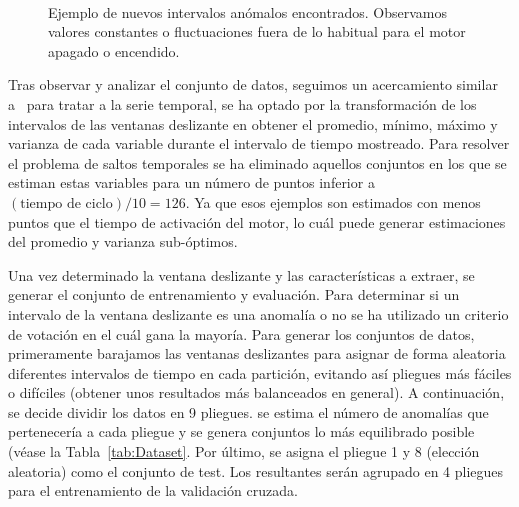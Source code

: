 \documentclass[12pt,letterpaper]{article}
\begin{document}
\begin{figure}[!ht]
        \centering
        \\
        \caption{Ejemplo de nuevos intervalos anómalos encontrados. Observamos valores constantes o fluctuaciones fuera de lo habitual para el motor apagado o encendido.}
        \label{fig:EventosRaros}
\end{figure}

Tras observar y analizar el conjunto de datos, seguimos un acercamiento similar a~\cite{PredictiveMaintenance,FailureDetection} para tratar a la serie temporal, 
se ha optado por la transformación de los intervalos de las ventanas deslizante en obtener el promedio, mínimo, máximo y varianza de cada variable durante el intervalo de tiempo mostreado. 
Para resolver el problema de saltos temporales se ha eliminado aquellos conjuntos en los que se estiman estas variables para un número de puntos inferior a $(\textrm{tiempo de ciclo}) / 10 = 126$. Ya que esos ejemplos 
son estimados con menos puntos que el tiempo de activación del motor, lo cuál puede generar estimaciones del promedio y varianza sub-óptimos.

Una vez determinado la ventana deslizante y las características a extraer, se generar el conjunto de entrenamiento y evaluación. 
Para determinar si un intervalo de la ventana deslizante es una anomalía o no se ha utilizado un criterio de votación en el cuál gana la mayoría.
Para generar los conjuntos de datos, primeramente barajamos las ventanas deslizantes para asignar de forma aleatoria diferentes intervalos de tiempo en cada partición, 
evitando así pliegues más fáciles o difíciles (obtener unos resultados más balanceados en general). A continuación, se decide dividir los datos en 9 pliegues. 
se estima el número de anomalías que pertenecería a cada pliegue y se genera conjuntos lo más equilibrado posible (véase la Tabla~\ref{tab:Dataset}. 
Por último, se asigna el pliegue 1 y 8 (elección aleatoria) como el conjunto de test. Los resultantes serán agrupado en 4 pliegues para el entrenamiento de la validación cruzada. 
\end{document}

